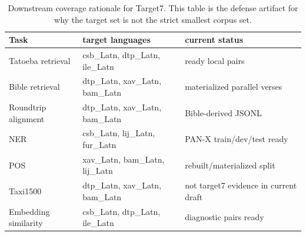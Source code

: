 \begin{table}[t]
\centering
\caption{Downstream coverage rationale for Target7. This table is the defense artifact for why the target set is not the strict smallest corpus set.}
\label{tab:task-coverage}
\begin{tabularx}{\textwidth}{lXl}
\toprule
Task & target languages & current status \\
\midrule
Tatoeba retrieval & csb\_Latn, dtp\_Latn, ile\_Latn & ready local pairs \\
Bible retrieval & dtp\_Latn, xav\_Latn, bam\_Latn & materialized parallel verses \\
Roundtrip alignment & dtp\_Latn, xav\_Latn, bam\_Latn & Bible-derived JSONL \\
NER & csb\_Latn, lij\_Latn, fur\_Latn & PAN-X train/dev/test ready \\
POS & xav\_Latn, bam\_Latn, lij\_Latn & rebuilt/materialized split \\
Taxi1500 & dtp\_Latn, xav\_Latn, bam\_Latn & not target7 evidence in current draft \\
Embedding similarity & csb\_Latn, dtp\_Latn, ile\_Latn & diagnostic pairs ready \\
\bottomrule
\end{tabularx}
\end{table}
